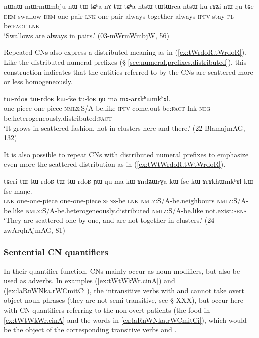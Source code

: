 \begin{exe}
\ex \label{ex:tWCha.nA.tWCha}
 \gll nɯnɯ mɯrmɯmbju nɯ tɯ-tɕʰa nɤ tɯ-tɕʰa ntsɯ tɯtɯrca ntsɯ ku-rɤʑi-nɯ ŋu tɕe \\
 \textsc{dem} swallow \textsc{dem} one-pair \textsc{lnk}  one-pair  always together always \textsc{ipfv}-stay-\textsc{pl} be:\textsc{fact} \textsc{lnk}  \\
 \glt `Swallows are always in pairs.' (03-mWrmWmbjW, 56)
\end{exe}

Repeated CNs also express a distributed meaning as in (\ref{ex:tWrdoR.tWrdoR}). Like the distributed numeral prefixes (§ \ref{sec:numeral.prefixes.distributed}), this construction indicates that the entities referred to by the CNs are scattered more or less homogeneously.

\begin{exe}
\ex \label{ex:tWrdoR.tWrdoR}
 \gll  tɯ-rdoʁ tɯ-rdoʁ kɯ-fse tu-ɬoʁ ŋu ma mɤ-arɤkʰɯmkʰɤl. \\
 one-piece one-piece \textsc{nmlz}:S/A-be.like \textsc{ipfv}-come.out  be:\textsc{fact} lnk \textsc{neg}-be.heterogeneously.distributed:\textsc{fact} \\
 \glt `It grows in scattered fashion, not in clusters here and there.' (22-BlamajmAG, 132)
\end{exe}

It is also possible to repeat CNs with distributed numeral prefixes to emphasize even more the scattered distribution as in (\ref{ex:tWtWrdoR.tWtWrdoR}).

\begin{exe}
\ex \label{ex:tWtWrdoR.tWtWrdoR}
 \gll 
tɕeri tɯ-tɯ-rdoʁ tɯ-tɯ-rdoʁ ɲɯ-ŋu ma kɯ-ɤndʑɯrɣa kɯ-fse kɯ-ɤrɤkhɯmkʰɤl kɯ-fse maŋe.  \\
\textsc{lnk} one-one-piece one-one-piece \textsc{sens}-be \textsc{lnk}  \textsc{nmlz}:S/A-be.neighbours \textsc{nmlz}:S/A-be.like \textsc{nmlz}:S/A-be.heterogeneously.distributed \textsc{nmlz}:S/A-be.like not.exist:\textsc{sens} \\
\glt  `They are scattered one by one, and are not together in clusters.' (24-zwArqhAjmAG, 81)
\end{exe}

\subsubsection{Sentential CN quantifiers}
In their quantifier function, CNs mainly occur as noun modifiers, but also be used as adverbs. In examples (\ref{ex:tWtWkWr.cinA}) and (\ref{ex:laRnWNka.rWCmitCi}), the intransitive verbs with  and  cannot take overt object noun phrases (they are not semi-transitive, see § XXX), but occur here with CN quantifiers referring to the non-overt patients (the food in \ref{ex:tWtWkWr.cinA} and the words in \ref{ex:laRnWNka.rWCmitCi}), which would be the object of the corresponding transitive verbs  and  .


